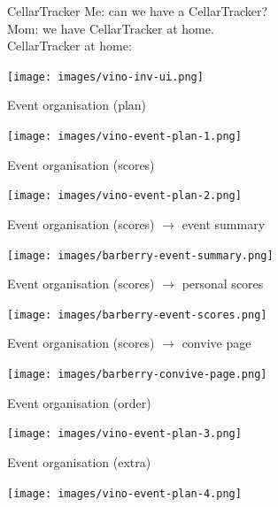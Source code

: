 \documentclass[presentation,aspectratio=169,smaller]{beamer}
\begin{document}
\begin{frame}[label={sec:org8f72928}]{CellarTracker}
Me: can we have a CellarTracker?\\
Mom: we have CellarTracker at home.\\
CellarTracker at home:

\begin{center}
\texttt{[image: images/vino-inv-ui.png]}
\end{center}
\end{frame}
\begin{frame}[label={sec:org8235623}]{Event organisation (plan)}
\begin{center}
\texttt{[image: images/vino-event-plan-1.png]}
\end{center}
\end{frame}
\begin{frame}[label={sec:org1f03e43}]{Event organisation (scores)}
\begin{center}
\texttt{[image: images/vino-event-plan-2.png]}
\end{center}
\end{frame}
\begin{frame}[label={sec:orgf8c8ce1}]{Event organisation (scores) \(\rightarrow\) event summary}
\begin{center}
\texttt{[image: images/barberry-event-summary.png]}
\end{center}
\end{frame}
\begin{frame}[label={sec:org39fbddb}]{Event organisation (scores) \(\rightarrow\) personal scores}
\begin{center}
\texttt{[image: images/barberry-event-scores.png]}
\end{center}
\end{frame}
\begin{frame}[label={sec:org686877c}]{Event organisation (scores) \(\rightarrow\) convive page}
\begin{center}
\texttt{[image: images/barberry-convive-page.png]}
\end{center}
\end{frame}
\begin{frame}[label={sec:org1ccab0f}]{Event organisation (order)}
\begin{center}
\texttt{[image: images/vino-event-plan-3.png]}
\end{center}
\end{frame}
\begin{frame}[label={sec:org3109df0}]{Event organisation (extra)}
\begin{center}
\texttt{[image: images/vino-event-plan-4.png]}
\end{center}
\end{frame}
\end{document}
